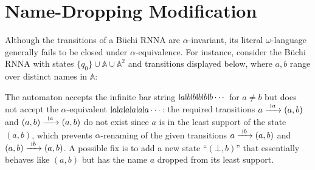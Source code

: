 \documentclass[10pt,a4paper]{amsart}
\newcommand{\midmid}{\hspace{0.2ex}{\rule[-0.1ex]{0.6pt}{1.65ex}}\hspace{0.2ex}}
\newcommand{\scriptmidmid}{\hspace{0.2ex}{\rule[-0.1ex]{0.6pt}{1.1ex}}\hspace{0.2ex}}
\newcommand{\newletter}[1]{{\midmid}#1}
\newcommand{\scriptnew}[1]{{\scriptmidmid}#1}
\numberwithin{equation}{section}
\newcommand{\xto}[1]{\xrightarrow{~#1~}}
\newcommand{\+}[1]{\mathcal{#1}\xspace}
\newcommand{\names}{\mathbb{A}}
\theoremstyle{definition}
\begin{document}
\section{Name-Dropping Modification}\label{sec:name-dropping}
%
Although the transitions of a Büchi RNNA are $\alpha$-invariant, its
literal $\omega$-language generally fails to be closed under
$\alpha$-equivalence. For instance, consider the Büchi RNNA with
states $\{q_0\}\cup \names \cup \names^2$ and transitions displayed
below, where $a,b$ range over distinct names in $\names$:
\begin{center}
\end{center}
The automaton accepts the infinite bar string
$\newletter a\newletter b\newletter b\newletter b\newletter
b\newletter b\cdots $ for $a\neq b$ but does not accept the
$\alpha$-equivalent
$\newletter a \newletter a \newletter a \newletter a \newletter a
\newletter a\cdots$: the required transitions $a\xto{\scriptnew a} (a,b)$ and
$(a,b)\xto{\scriptnew a} (a,b)$ do not exist since $a$ is in the least support of the state $(a,b)$, which prevents $\alpha$-renaming of the given transitions $a\xto{\scriptnew b} (a,b)$ and $(a,b)\xto{\scriptnew b}(a,b)$.
A possible fix is to add a new
state ``$(\bot, b)$'' that essentially behaves like $(a,b)$ but has the name
$a$ dropped from its least support.
\end{document}
